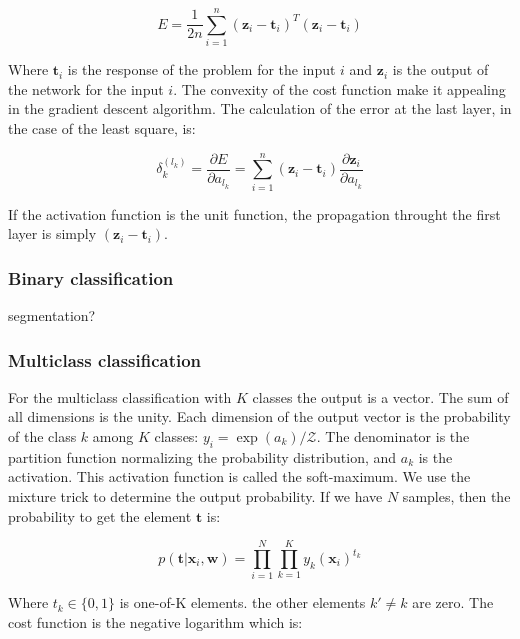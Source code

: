 \documentclass[final, paper=letter,5p,times,twocolumn]{elsarticle}
\begin{document}
\begin{equation}
  E = \frac{1}{2n} \sum_{i = 1}^{n} (\bm{z}_{i} - \bm{t}_{i})^{T}(\bm{z}_{i} - \bm{t}_{i})
  \label{eq:least_squarre}
\end{equation}

Where $\bm{t}_{i}$ is the response of the problem for the input $i$ and $\bm{z}_{i}$ is the output of the network for the input $i$. The convexity of the cost function make it appealing in the gradient descent algorithm. The calculation of the error at the last layer, in the case of the least square, is:

\begin{equation}
  \delta_{k}^{(l_{k})} = \frac{\partial E}{\partial a_{l_{k}}} = \sum_{i = 1}^{n} (\bm{z}_{i} - \bm{t}_{i})\frac{\partial \bm{z}_{i}}{\partial a_{l_{k}}}
  \label{eq:least_squarre_error}
\end{equation}
 
If the activation function is the unit function, the propagation throught the first layer is simply $(\bm{z}_{i} - \bm{t}_{i})$.

\subsubsection{Binary classification}

segmentation?

\subsubsection{Multiclass classification}
\label{sec:MulticlassClassification}

For the multiclass classification with $K$ classes the output is a vector. The sum of all dimensions is the unity. Each dimension of the output vector is the probability of the class $k$ among $K$ classes: $y_{i} = \exp(a_{k}) / \mathcal{Z}$. The denominator is the partition function normalizing the probability distribution, and $a_{k}$ is the activation. This activation function is called the soft-maximum. We use the mixture trick to determine the output probability. If we have $N$ samples, then the probability to get the element $\bm{t}$ is:

\begin{equation}
p(\bm{t} | \bm{x}_{i}, \bm{w}) = \prod_{i=1}^{N}\prod_{k=1}^{K} y_{k}(\bm{x}_{i})^{t_{k}}
\end{equation}

Where $t_{k} \in \{0,1\}$ is one-of-K elements. the other elements $k' \ne k$ are zero. The cost function is the negative logarithm which is:
\end{document}
